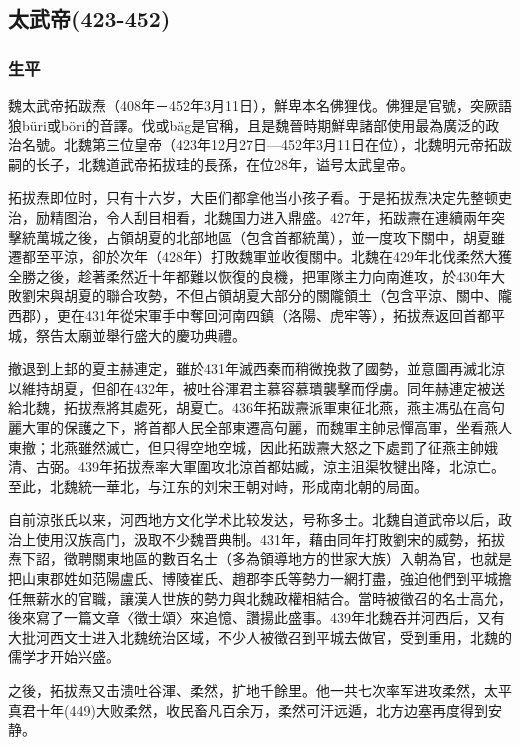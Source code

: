 
\subsection{太武帝\tiny(423-452)}

\subsubsection{生平}

魏太武帝拓跋焘（408年－452年3月11日），鮮卑本名佛狸伐。佛狸是官號，突厥語狼büri或böri的音譯。伐或bäg是官稱，且是魏晉時期鮮卑諸部使用最為廣泛的政治名號。北魏第三位皇帝（423年12月27日—452年3月11日在位），北魏明元帝拓跋嗣的长子，北魏道武帝拓拔珪的長孫，在位28年，谥号太武皇帝。

拓拔焘即位时，只有十六岁，大臣们都拿他当小孩子看。于是拓拔焘决定先整顿吏治，励精图治，令人刮目相看，北魏国力进入鼎盛。427年，拓跋燾在連續兩年突擊統萬城之後，占領胡夏的北部地區（包含首都統萬），並一度攻下關中，胡夏雖遷都至平涼，卻於次年（428年）打敗魏軍並收復關中。北魏在429年北伐柔然大獲全勝之後，趁著柔然近十年都難以恢復的良機，把軍隊主力向南進攻，於430年大敗劉宋與胡夏的聯合攻勢，不但占領胡夏大部分的關隴領土（包含平涼、關中、隴西郡），更在431年從宋軍手中奪回河南四鎮（洛陽、虎牢等），拓拔焘返回首都平城，祭告太廟並舉行盛大的慶功典禮。

撤退到上邽的夏主赫連定，雖於431年滅西秦而稍微挽救了國勢，並意圖再滅北涼以維持胡夏，但卻在432年，被吐谷渾君主慕容慕璝襲擊而俘虜。同年赫連定被送給北魏，拓拔焘將其處死，胡夏亡。436年拓跋燾派軍東征北燕，燕主馮弘在高句麗大軍的保護之下，將首都人民全部東遷高句麗，而魏軍主帥忌憚高軍，坐看燕人東撤；北燕雖然滅亡，但只得空地空城，因此拓跋燾大怒之下處罰了征燕主帥娥清、古弼。439年拓拔焘率大軍圍攻北涼首都姑臧，涼主沮渠牧犍出降，北涼亡。至此，北魏統一華北，与江东的刘宋王朝对峙，形成南北朝的局面。

自前涼张氏以来，河西地方文化学术比较发达，号称多士。北魏自道武帝以后，政治上使用汉族高门，汲取不少魏晋典制。431年，藉由同年打敗劉宋的威勢，拓拔焘下詔，徵聘關東地區的數百名士（多為領導地方的世家大族）入朝為官，也就是把山東郡姓如范陽盧氏、博陵崔氏、趙郡李氏等勢力一網打盡，強迫他們到平城擔任無薪水的官職，讓漢人世族的勢力與北魏政權相結合。當時被徵召的名士高允，後來寫了一篇文章〈徵士頌〉來追憶、讚揚此盛事。439年北魏吞并河西后，又有大批河西文士进入北魏统治区域，不少人被徵召到平城去做官，受到重用，北魏的儒学才开始兴盛。

之後，拓拔焘又击溃吐谷渾、柔然，扩地千餘里。他一共七次率军进攻柔然，太平真君十年(449)大败柔然，收民畜凡百余万，柔然可汗远遁，北方边塞再度得到安静。

